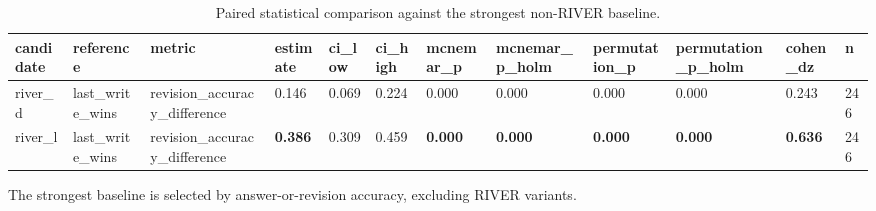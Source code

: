 \begin{table}
\centering
\caption{Paired statistical comparison against the strongest non-RIVER baseline.}
\begin{tabular}{llllllllllll}
candidate & reference & metric & estimate & ci\_low & ci\_high & mcnemar\_p & mcnemar\_p\_holm & permutation\_p & permutation\_p\_holm & cohen\_dz & n \\ \hline
river\_d & last\_write\_wins & revision\_accuracy\_difference & 0.146 & 0.069 & 0.224 & 0.000 & 0.000 & 0.000 & 0.000 & 0.243 & 246 \\
river\_l & last\_write\_wins & revision\_accuracy\_difference & \textbf{0.386} & 0.309 & 0.459 & \textbf{0.000} & \textbf{0.000} & \textbf{0.000} & \textbf{0.000} & \textbf{0.636} & 246 \\
\end{tabular}
\footnotesize{The strongest baseline is selected by answer-or-revision accuracy, excluding RIVER variants.}
\end{table}
